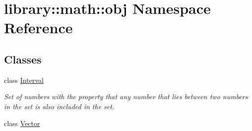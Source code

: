 \hypertarget{namespacelibrary_1_1math_1_1obj}{}\section{library\+:\+:math\+:\+:obj Namespace Reference}
\label{namespacelibrary_1_1math_1_1obj}
\subsection*{Classes}
\begin{DoxyCompactItemize}
\item 
class \hyperlink{classlibrary_1_1math_1_1obj_1_1_interval}{Interval}
\begin{DoxyCompactList}\small\item\em Set of numbers with the property that any number that lies between two numbers in the set is also included in the set. \end{DoxyCompactList}\item 
class \hyperlink{classlibrary_1_1math_1_1obj_1_1_vector}{Vector}
\end{DoxyCompactItemize}
